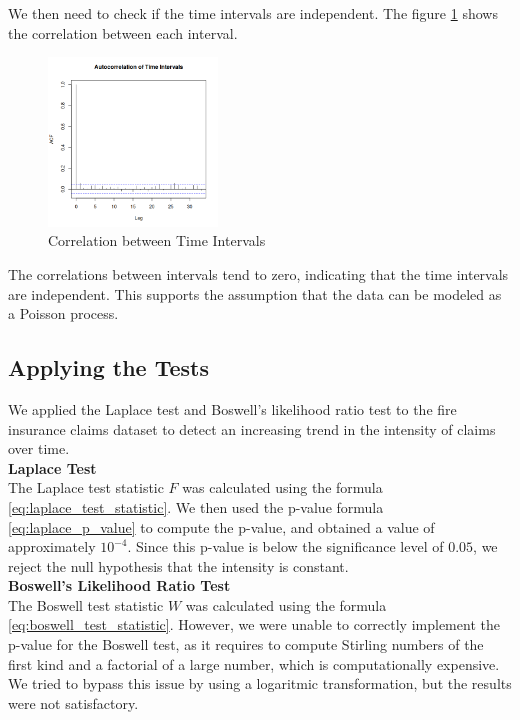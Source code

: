\documentclass{journalstyle}
\begin{document}
We then need to check if the time intervals are independent.
The figure \ref{fig:correlation_intervals} shows the correlation between each interval.

\begin{figure}[H]
    \centering
    \includegraphics[width=0.4\textwidth]{src/correlation_intervals.png}
    \caption{Correlation between Time Intervals}
    \label{fig:correlation_intervals}
\end{figure}

The correlations between intervals tend to zero, indicating that the time intervals are independent.
This supports the assumption that the data can be modeled as a Poisson process.


\subsection{Applying the Tests}
We applied the Laplace test and Boswell's likelihood ratio test to the fire insurance claims dataset to detect an increasing trend in the intensity of claims over time. \\

\noindent\textbf{Laplace Test} \\
The Laplace test statistic $F$ was calculated using the formula \eqref{eq:laplace_test_statistic}.
We then used the p-value formula \eqref{eq:laplace_p_value} to compute the p-value, and obtained a value of approximately $10^{-4}$.
Since this p-value is below the significance level of $0.05$, we reject the null hypothesis that the intensity is constant. \\

\noindent\textbf{Boswell's Likelihood Ratio Test} \\
The Boswell test statistic $W$ was calculated using the formula \eqref{eq:boswell_test_statistic}.
However, we were unable to correctly implement the p-value for the Boswell test, as it requires to compute Stirling numbers of the first kind and a factorial of a large number, which is computationally expensive.
We tried to bypass this issue by using a logaritmic transformation, but the results were not satisfactory. \\
\end{document}
